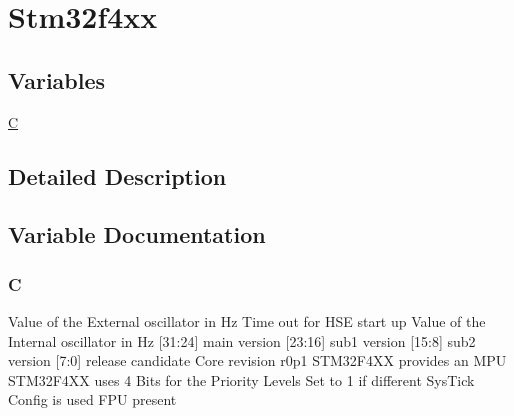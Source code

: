 \hypertarget{group__stm32f4xx}{\section{Stm32f4xx}
\label{group__stm32f4xx}
}
\subsection*{Variables}
\begin{DoxyCompactItemize}
\item 
\hyperlink{group__stm32f4xx_gaaa53ca0b650dfd85c4f59fa156f7a2cc}{C}
\end{DoxyCompactItemize}


\subsection{Detailed Description}


\subsection{Variable Documentation}
\hypertarget{group__stm32f4xx_gaaa53ca0b650dfd85c4f59fa156f7a2cc}{
\subsubsection[{C}]{\setlength{\rightskip}{0pt plus 5cm}C}}\label{group__stm32f4xx_gaaa53ca0b650dfd85c4f59fa156f7a2cc}
Value of the External oscillator in Hz Time out for H\-S\-E start up Value of the Internal oscillator in Hz \mbox{[}31\-:24\mbox{]} main version \mbox{[}23\-:16\mbox{]} sub1 version \mbox{[}15\-:8\mbox{]} sub2 version \mbox{[}7\-:0\mbox{]} release candidate Core revision r0p1 S\-T\-M32\-F4\-X\-X provides an M\-P\-U S\-T\-M32\-F4\-X\-X uses 4 Bits for the Priority Levels Set to 1 if different Sys\-Tick Config is used F\-P\-U present 